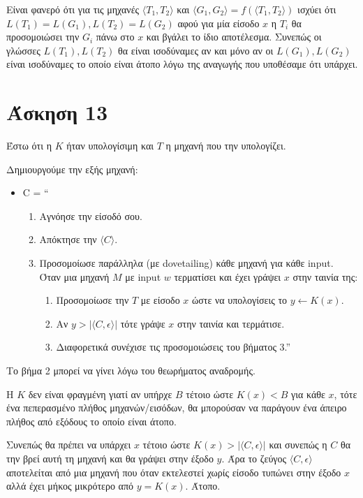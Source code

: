 \documentclass[a4paper, oneside, 11pt]{article}
\theoremstyle{definition}
\begin{document}
Είναι φανερό ότι για τις μηχανές $\langle T_1, T_2 \rangle$ και $\langle G_1,
G_2 \rangle = f(\langle T_1, T_2 \rangle)$ ισχύει ότι $L(T_1) = L(G_1), L(T_2) =
L(G_2)$ αφού για μία είσοδο $x$ η $T_i$ θα προσομοιώσει την $G_i$ πάνω στο $x$
και βγάλει το ίδιο αποτέλεσμα. Συνεπώς οι γλώσσες $L(T_1), L(T_2)$ θα είναι
ισοδύναμες αν και μόνο αν οι $L(G_1), L(G_2)$ είναι ισοδύναμες το οποίο είναι
άτοπο λόγω της αναγωγής που υποθέσαμε ότι υπάρχει.

\section*{Άσκηση 13}
Έστω ότι η $K$ ήταν υπολογίσιμη και $T$ η μηχανή που την υπολογίζει.

Δημιουργούμε την εξής μηχανή:

\begin{itemize}
\item C = ``
\begin{enumerate}
\item Αγνόησε την είσοδό σου.
\item Απόκτησε την $\langle C \rangle$.
\item Προσομοίωσε παράλληλα (με dovetailing) κάθε μηχανή για κάθε input.\\
Όταν μια μηχανή $M$ με input $w$ τερματίσει και έχει γράψει $x$ στην ταινία της:
\begin{enumerate}
\item Προσομοίωσε την $T$ με είσοδο $x$ ώστε να υπολογίσεις το $y \leftarrow
K(x)$.
\item Αν $y > |\langle C, \epsilon \rangle|$ τότε γράψε $x$ στην ταινία και τερμάτισε.
\item Διαφορετικά συνέχισε τις προσομοιώσεις του βήματος 3.''
\end{enumerate}
\end{enumerate}
\end{itemize}

Το βήμα 2 μπορεί να γίνει λόγω του θεωρήματος αναδρομής.

Η $K$ δεν είναι φραγμένη γιατί αν υπήρχε $B$ τέτοιο ώστε $K(x) < B$ για κάθε
$x$, τότε ένα πεπερασμένο πλήθος μηχανών/εισόδων, θα μπορούσαν να παράγουν ένα
άπειρο πλήθος από εξόδους το οποίο είναι άτοπο.

Συνεπώς θα πρέπει να υπάρχει $x$ τέτοιο ώστε $K(x) > |\langle C, \epsilon
\rangle|$ και συνεπώς η $C$ θα την βρεί αυτή τη μηχανή και θα γράψει στην έξοδο
$y$. Άρα το ζεύγος $\langle C, \epsilon \rangle$ αποτελείται από μια μηχανή που
όταν εκτελεστεί χωρίς είσοδο τυπώνει στην έξοδο $x$ αλλά έχει μήκος μικρότερο
από $y = K(x)$. Άτοπο.
\end{document}
